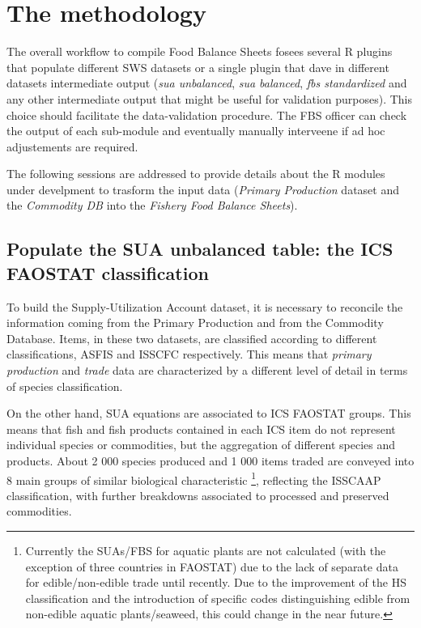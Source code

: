 \documentclass[nojss]{jss}
\begin{document}
\section {The methodology}


The overall workflow to compile Food Balance Sheets fosees several R plugins that populate different SWS datasets or a single plugin that dave in different datasets intermediate output (\textit{sua unbalanced}, \textit{sua balanced}, \textit{fbs standardized} and any other intermediate output that might be useful for validation purposes). This choice should facilitate the data-validation procedure. The FBS officer can check the output of each sub-module and eventually manually interveene if ad hoc adjustements are required. 


The following sessions are addressed to provide details about the R modules under develpment to trasform the input data (\textit{Primary Production} dataset and the \textit{Commodity DB} into the \textit{Fishery Food Balance Sheets}).



\subsection{Populate the SUA unbalanced table: the ICS FAOSTAT classification}
To build the Supply-Utilization Account dataset, it is necessary to reconcile the information coming from the Primary Production and from the Commodity Database. Items, in these two datasets, are classified according to different classifications, ASFIS and ISSCFC respectively. This means that \textit{primary production}  and \textit{trade} data are characterized by a different level of detail in terms of species classification.

On the other hand, SUA equations are associated to ICS FAOSTAT groups. This means that fish and fish products contained in each ICS item do not represent individual species or commodities, but the aggregation of different species and products. About 2 000 species produced and 1 000 items traded are conveyed into 8 main groups of similar biological characteristic \footnote{Currently the SUAs/FBS for aquatic plants are not calculated (with the exception of three countries in FAOSTAT) due to the lack of separate data for edible/non-edible trade until recently. Due to the improvement of the HS classification and the introduction of specific codes distinguishing edible from non-edible aquatic plants/seaweed, this could change in the near future.}, reflecting the ISSCAAP classification,  with further breakdowns associated to processed and preserved commodities.
\end{document}
